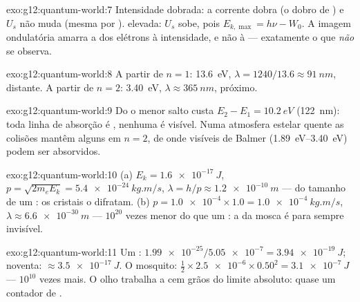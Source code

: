 \begin{solution}{exo:g12:quantum-world:7}
Intensidade dobrada: a corrente dobra (o dobro de ) e $U_s$ não
muda (mesma  por ).  elevada: $U_s$ sobe, pois
$E_{k,\max} = h\nu - W_0$. A imagem ondulatória amarra a  dos
elétrons à intensidade, e não à  --- exatamente o que
\emph{não} se observa.
\end{solution}

\begin{solution}{exo:g12:quantum-world:8}
A partir de $n = 1$: \qty{13.6}{eV},
$\lambda = 1240/13.6 \approx \qty{91}{nm}$,  distante. A
partir de $n = 2$: \qty{3.40}{eV}, $\lambda \approx \qty{365}{nm}$,
 próximo.
\end{solution}

\begin{solution}{exo:g12:quantum-world:9}
Do  o menor salto custa
$E_2 - E_1 = \qty{10.2}{eV}$ (\qty{122}{nm}): toda linha de absorção é
, nenhuma é visível. Numa atmosfera estelar quente as
colisões mantêm alguns  em $n = 2$, de onde  visíveis de
Balmer (\qtyrange{1.89}{3.40}{eV}) podem ser absorvidos.
\end{solution}

\begin{solution}{exo:g12:quantum-world:10}
(a) $E_k = \qty{1.6e-17}{J}$,
$p = \sqrt{2m_e E_k} = \qty{5.4e-24}{kg.m/s}$,
$\lambda = h/p \approx \qty{1.2e-10}{m}$ --- do tamanho de um : os
cristais o difratam. (b) $p = \num{1.0e-4} \times 1.0 =
\qty{1.0e-4}{kg.m/s}$, $\lambda \approx \qty{6.6e-30}{m}$ --- $10^{20}$
vezes menor do que um : a  da mosca é para sempre invisível.
\end{solution}

\begin{solution}{exo:g12:quantum-world:11}
Um : $\num{1.99e-25}/\num{5.05e-7} = \qty{3.94e-19}{J}$; noventa:
$\approx \qty{3.5e-17}{J}$. O mosquito:
$\tfrac12 \times \num{2.5e-6} \times 0.50^2 = \qty{3.1e-7}{J}$ ---
$10^{10}$ vezes mais. O olho trabalha a cem grãos do limite absoluto:
quase um contador de .
\end{solution}

